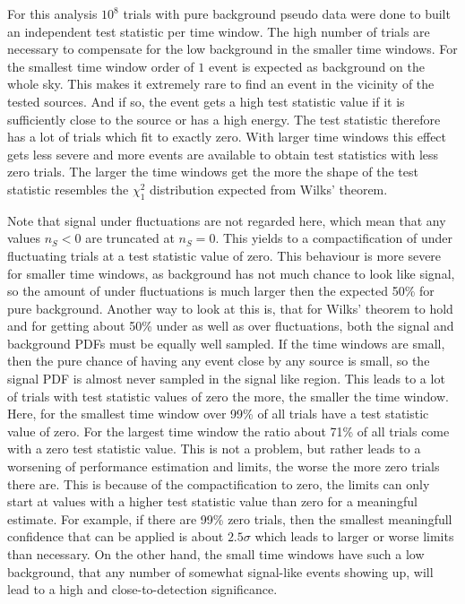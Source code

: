 For this analysis $10^8$ trials with pure background pseudo data were done to built an independent test statistic per time window.
The high number of trials are necessary to compensate for the low background in the smaller time windows.
For the smallest time window order of $1$ event is expected as background on the whole sky.
This makes it extremely rare to find an event in the vicinity of the tested sources.
And if so, the event gets a high test statistic value if it is sufficiently close to the source or has a high energy.
The test statistic therefore has a lot of trials which fit to exactly zero.
With larger time windows this effect gets less severe and more events are available to obtain test statistics with less zero trials.
The larger the time windows get the more the shape of the test statistic resembles the $\chi^2_1$ distribution expected from Wilks' theorem.

Note that signal under fluctuations are not regarded here, which mean that any values $n_S < 0$ are truncated at $n_S=0$.
This yields to a compactification of under fluctuating trials at a test statistic value of zero.
This behaviour is more severe for smaller time windows, as background has not much chance to look like signal, so the amount of under fluctuations is much larger then the expected 50\% for pure background.
Another way to look at this is, that for Wilks' theorem to hold and for getting about 50\% under as well as over fluctuations, both the signal and background PDFs must be equally well sampled.
If the time windows are small, then the pure chance of having any event close by any source is small, so the signal PDF is almost never sampled in the signal like region.
This leads to a lot of trials with test statistic values of zero the more, the smaller the time window.
Here, for the smallest time window over 99\% of all trials have a test statistic value of zero.
For the largest time window the ratio about 71\% of all trials come with a zero test statistic value.
This is not a problem, but rather leads to a worsening of performance estimation and limits, the worse the more zero trials there are.
This is because of the compactification to zero, the limits can only start at values with a higher test statistic value than zero for a meaningful estimate.
For example, if there are 99\% zero trials, then the smallest meaningfull confidence that can be applied is about $2.5\sigma$ which leads to larger or worse limits than necessary.
On the other hand, the small time windows have such a low background, that any number of somewhat signal-like events showing up, will lead to a high and close-to-detection significance.

